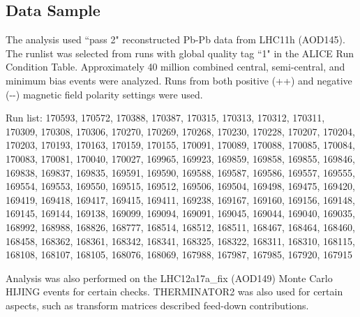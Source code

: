 \documentclass[../AnalysisNoteJBuxton.tex]{subfiles}
\begin{document}
\subsection{Data Sample}
\label{sec:DataSample}

The analysis used ``pass 2" reconstructed Pb-Pb data from LHC11h (AOD145).
The runlist was selected from runs with global quality tag ``1" in the ALICE Run Condition Table.
Approximately 40 million combined central, semi-central, and minimum bias events were analyzed.
Runs from both positive (++) and negative (-{}-) magnetic field polarity settings were used.

Run list:  	
170593, 170572, 170388, 170387, 170315, 170313, 170312, 170311, 170309, 170308, 170306, 170270, 170269, 170268, 170230, 170228, 170207, 170204, 170203, 170193, 170163, 170159, 170155, 170091, 170089, 170088, 170085, 170084, 170083, 170081, 170040, 170027, 169965, 169923, 169859, 169858, 169855, 169846, 169838, 169837, 169835, 169591, 169590, 169588, 169587, 169586, 169557, 169555, 169554, 169553, 169550, 169515, 169512, 169506, 169504, 169498, 169475, 169420, 169419, 169418, 169417, 169415, 169411, 169238, 169167, 169160, 169156, 169148, 169145, 169144, 169138, 169099, 169094, 169091, 169045, 169044, 169040, 169035, 168992, 168988, 168826, 168777, 168514, 168512, 168511, 168467, 168464, 168460, 168458, 168362, 168361, 168342, 168341, 168325, 168322, 168311, 168310, 168115, 168108, 168107, 168105, 168076, 168069, 167988, 167987, 167985, 167920, 167915

Analysis was also performed on the LHC12a17a\_fix (AOD149) Monte Carlo HIJING events for certain checks.  THERMINATOR2 was also used for certain aspects, such as transform matrices described feed-down contributions.
\end{document}
